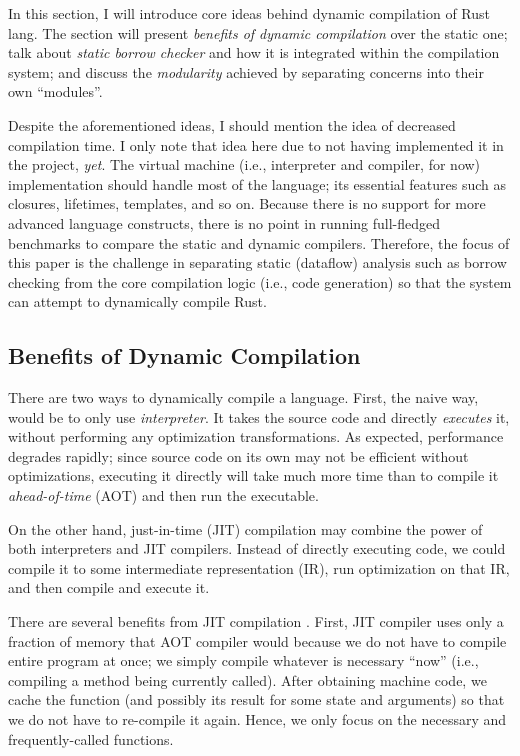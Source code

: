 
In this section, I will introduce core ideas behind dynamic compilation
of Rust lang. The section will present \textit{benefits of 
dynamic compilation} over the static one; talk about 
\textit{static borrow checker} and how it is integrated within the compilation
system; and discuss the \textit{modularity} achieved by separating concerns
into their own ``modules''.

Despite the aforementioned ideas, I should mention the idea of 
decreased compilation time. I only note that idea here due to
not having implemented it in the project, \textit{yet}. The virtual machine 
(i.e., interpreter and compiler, for now) implementation should
handle most of the language; its essential features such as closures,
lifetimes, templates, and so on. Because there is no support for more
advanced language constructs, there is no point in running
full-fledged benchmarks to compare the static and dynamic
compilers. Therefore, the focus of this paper is the challenge in separating
static (dataflow) analysis such as borrow checking from the core compilation
logic (i.e., code generation) so that the system can attempt to 
dynamically compile Rust.

\subsection{Benefits of Dynamic Compilation}

There are two ways to dynamically compile a language.
First, the naive way, would be to only use \textit{interpreter}. It takes
the source code and directly \textit{executes} it, without performing
any optimization transformations. As expected,
performance degrades rapidly; since source code on its own
may not be efficient without optimizations, executing it directly
will take much more time than to compile it \textit{ahead-of-time} (AOT) and
then run the executable.

On the other hand, just-in-time (JIT) compilation may combine the power of 
both interpreters and JIT compilers. Instead of directly executing code,
we could compile it to some intermediate representation (IR), run optimization
on that IR, and then compile and execute it.

There are several benefits from JIT compilation \cite{jitlec}. First, JIT compiler uses
only a fraction of memory that AOT compiler would because we do not have
to compile entire program at once; we simply compile whatever is necessary 
``now'' (i.e., compiling a method being currently called). After obtaining
machine code, we cache the function (and possibly its result for some
state and arguments) so that we do not have to re-compile it again. Hence,
we only focus on the necessary and frequently-called functions.


